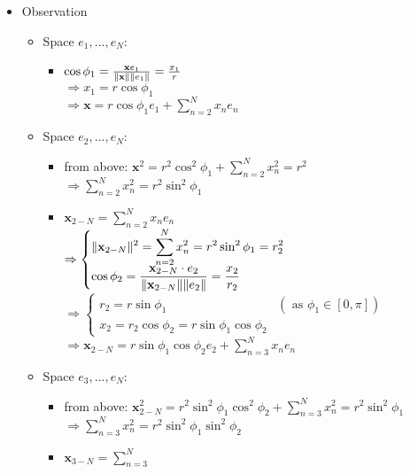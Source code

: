 \begin{itemize}
\item Observation
	\begin{itemize}
	\item Space $e_1,...,e_N$:
		\begin{itemize}
		\item $\cos \phi_1 = \frac{\mathbf x e_1}{\lVert\mathbf x\rVert \lVert e_1\rVert} =\frac {x_1}{r} $ \\ 
			$\Rightarrow x_1 = r\cos\phi_1$ \\
			$\displaystyle \Rightarrow \mathbf x = r\cos\phi_1 e_1 + \sum_{n=2}^Nx_ne_n$
		\end{itemize}
	\item Space $e_2,...,e_N$:
		\begin{itemize}
		\item from above: $\displaystyle \mathbf x^2 = r^2\cos^2\phi_1 + \sum_{n=2}^N x_n^2 = r^2 $ \\ 
			$\displaystyle \Rightarrow \sum_{n=2}^N x_n^2 = r^2\sin^2\phi_1$
		\item $\displaystyle \mathbf x_{2-N} = \sum_{n=2}^Nx_ne_n$ \\
		$\displaystyle \Rightarrow \begin{cases} \displaystyle  \lVert\mathbf x_{2-N}\rVert^2 = \sum_{n=2}^Nx_n^2 = r^2\sin^2\phi_1 = r_2^2 \\ \displaystyle \cos\phi_2 = \frac {\mathbf x_{2-N}\cdot e_2}{\lVert\mathbf x_{2-N}\rVert\lVert e_2\rVert} = \frac{x_2}{r_2} \end{cases}$ \\
		$\Rightarrow \begin{cases} r_2 = r\sin\phi_1 & (\text{ as }\phi_1\in [0,\pi]) \\ x_2 = r_2\cos\phi_2 = r\sin\phi_1\cos\phi_2 \end{cases}$ \\
		$\displaystyle \Rightarrow \mathbf x_{2-N} = r\sin\phi_1\cos\phi_2e_2 + \sum_{n=3}^Nx_ne_n$ \\
		\end{itemize}
	\item Space $e_3,...,e_N$:
		\begin{itemize}
		\item from above: $\displaystyle \mathbf x_{2-N}^2 = r^2\sin^2\phi_1\cos^2\phi_2 + \sum_{n=3}^{N}x_n^2 = r^2\sin^2\phi_1$ \\
			$\displaystyle \Rightarrow \sum_{n=3}^N x_n^2 = r^2\sin^2\phi_1\sin^2\phi_2$
		\item $\displaystyle \mathbf x_{3-N} = \sum_{n=3}^N$ \\

\end{itemize}
\end{itemize}
\end{itemize}
